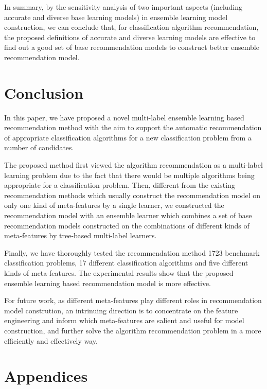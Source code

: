 \documentclass[acmsmall]{acmart}
\begin{document}
In summary, by the sensitivity analysis of two important aspects
(including accurate and diverse base learning models) in ensemble
learning model construction, we can conclude that, for
classification algorithm recommendation, the proposed definitions of
accurate and diverse learning models are effective to find out a
good set of base recommendation models to construct better ensemble
recommendation model.


\section{Conclusion}\label{sec:conclusion}

In this paper, we have proposed a novel multi-label ensemble
learning based recommendation method with the aim to support the
automatic recommendation of appropriate classification algorithms
for a new classification problem from a number of candidates.

The proposed method first viewed the algorithm recommendation as a
multi-label learning problem due to the fact that there would be
multiple algorithms being appropriate for a classification problem.
Then, different from the existing recommendation methods which
usually construct the recommendation model on only one kind of
meta-features by a single learner, we constructed the recommendation
model with an ensemble learner which combines a set of base
recommendation models constructed on the combinations of different
kinds of meta-features by tree-based multi-label learners.

Finally, we have thoroughly tested the recommendation method 1723
benchmark classification problems, 17 different classification
algorithms and five different kinds of meta-features. The
experimental results show that the proposed ensemble learning based
recommendation model is more effective.

For future work, as different meta-features play different roles in recommendation model constrution, an intrinuing direction is to concentrate on the feature engineering and inform which meta-features are salient and useful for model construction, and further solve the algorithm recommendation problem in a more efficiently and effectively way.










\section{Appendices}
\appendix
\end{document}
